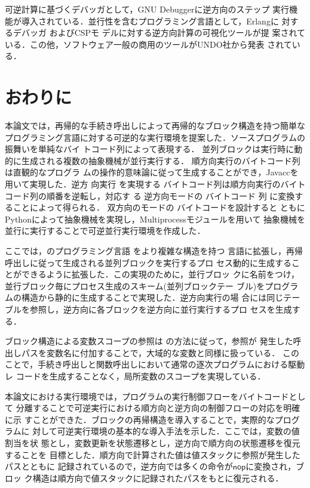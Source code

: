 \documentclass[submit,PRO]{ipsj}
\newcommand{\bcode}[1]{$\mathsf{#1}$}
\begin{document}
可逆計算に基づくデバッガとして，GNU Debugger\cite{GDB}に逆方向のステップ
実行機能が導入されている．並行性を含むプログラミング言語として，Erlangに
対するデバッガ
\cite{DBLP:conf/flops/Lanese0PV18,DBLP:conf/forte/LanesePV19}およびCSPモ
デルに対する逆方向計算の可視化ツール\cite{DBLP:conf/rc/Galindo0ST20}が提
案されている．この他，ソフトウェア一般の商用のツールがUNDO社から発表
\cite{UNDODebugger}されている．

\section{おわりに}

本論文では，再帰的な手続き呼出しによって再帰的なブロック構造を持つ簡単な
プログラミング言語に対する可逆的な実行環境を提案した．ソースプログラムの
振舞いを単純なバイ
トコード列によって表現する．
並列ブロックは実行時に動的に生成される複数の抽象機械が並行実行する．
順方向実行のバイトコード列は直観的なプログラ
ムの操作的意味論に従って生成することができ，Javaccを用いて実現した．逆方
向実行%
を実現する%
バイトコード列は順方向実行のバイトコード列の順番を逆転し，対応す
る%
逆方向モードの%
バイトコード%
列%
に変換することによって得られる．%
双方向のモードの%
バイトコードを設計すると
ともにPythonによって抽象機械を実現し，Multiprocessモジュールを用いて
抽象機械を並行に実行することで可逆並行実行環境を作成した．

ここでは，\cite{DBLP:conf/rc/IkedaY20}のプログラミング言語%
をより複雑な構造を持つ%
言語に拡張し，再帰呼出しに従って生成される並列ブロックを実行するプロ
セス動的に生成することができるように拡張した．この実現のために，並行ブロッ
クに名前をつけ，並行ブロック毎にプロセス生成のスキーム(並列ブロックテー
ブル)をプログラムの構造から静的に生成することで実現した．逆方向実行の場
合には同じテーブルを参照し，逆方向に各ブロックを逆方向に並行実行するプロ
セスを生成する．

ブロック構造による変数スコープの参照は
\cite{DBLP:journals/corr/abs-1808-08651,Hoey20PHD}の方法に従って，参照が
発生した呼出しパスを変数名に付加することで，大域的な変数と同様に扱っている．
このことで，手続き呼出しと関数呼出しにおいて通常の逐次プログラムにおける駆動レ
コードを生成することなく，局所変数のスコープを実現している．

本論文における実行環境では，プログラムの実行制御フローをバイトコードとして
分離することで可逆実行における順方向と逆方向の制御フローの対応を明確に示
すことができた．ブロックの再帰構造を導入することで，実際的なプログラムに
対して可逆実行環境の基本的な導入手法を示した．ここでは，変数の値割当を状
態とし，変数更新を状態遷移とし，逆方向で順方向の状態遷移を復元することを
目標とした．順方向で計算された値は値スタックに参照が発生したパスとともに
記録されているので，逆方向では多くの命令が\bcode{nop}に変換され，ブロッ
ク構造は順方向で値スタックに記録されたパスをもとに復元される．
\end{document}

